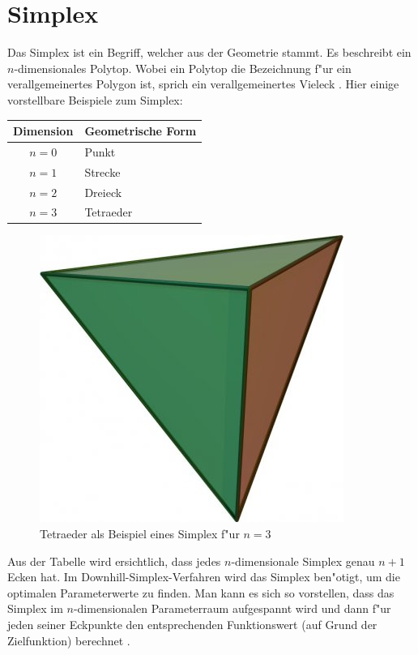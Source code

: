 \section{Simplex}
Das Simplex ist ein Begriff, welcher aus der Geometrie stammt. Es
beschreibt ein $n$-dimensionales Polytop. Wobei ein Polytop die Bezeichnung
f"ur ein verallgemeinertes Polygon ist, sprich ein verallgemeinertes
Vieleck \cite{bib:link4}. 
Hier einige vorstellbare Beispiele zum Simplex:
 
\begin{center}
\begin{tabular}{c|l}
Dimension & Geometrische Form\\
\hline
$n=0$ & Punkt\\
$n=1$ & Strecke\\
$n=2$ & Dreieck\\
$n=3$ & Tetraeder
\end{tabular}
\end{center}

\begin{figure}
\centering
\includegraphics[height=0.25\textwidth]{downhill/tetraeder.jpg}
\caption{Tetraeder als Beispiel eines Simplex f"ur $n=3$}
\end{figure}

Aus der Tabelle wird ersichtlich, dass jedes $n$-dimensionale Simplex genau $n+1$ Ecken hat.
Im Downhill-Simplex-Verfahren wird das Simplex ben"otigt, um die
optimalen Parameterwerte zu finden. Man kann es sich so vorstellen,
dass das Simplex im $n$-dimensionalen Parameterraum aufgespannt wird und
dann f"ur jeden seiner Eckpunkte den entsprechenden Funktionswert (auf
Grund der Zielfunktion) berechnet \cite{bib:link3}.
